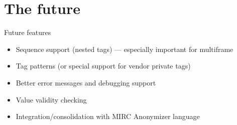 \documentclass[handout]{beamer}
\begin{document}
\section{The future}
\begin{frame}{Future features}
\begin{itemize}
\pause \item Sequence support (nested tags) --- especially important
for multiframe
\pause \item Tag patterns (or special support for vendor private tags)
\pause \item Better error messages and debugging support
\pause \item Value validity checking
\pause \item Integration/consolidation with MIRC Anonymizer language
\end{itemize}
\end{frame}
\end{document}
